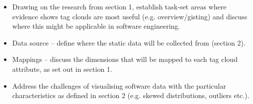 
\begin{itemize}
	\item Drawing on the research from section 1, establish task-set areas where evidence shows tag clouds are most useful (e.g. overview/gisting) and discuss where this might be applicable in software engineering. 
	\item Data source – define where the static data will be collected from (section 2).
	\item Mappings – discuss the dimensions that will be mapped to each tag cloud attribute, as set out in section 1.
	\item Address the challenges of visualising software data with the particular characteristics as defined in section 2 (e.g. skewed distributions, outliers etc.). 
\end{itemize}


